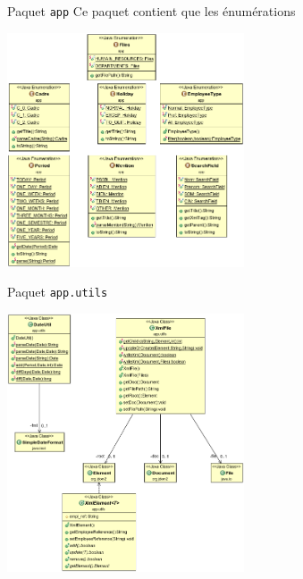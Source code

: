 \documentclass[captions=tableheading]{beamer}
\begin{document}
\begin{frame}[fragile,label={sec:orgc6680c5}]{Paquet \texttt{app}}
 Ce paquet contient que les énumérations \pause
\begin{center}
\includegraphics[width=7cm]{./diags/OverviewOnApp.png}
\end{center}
\end{frame}
\begin{frame}[fragile,label={sec:org65665a4}]{Paquet \texttt{app.utils}}
 \begin{center}
\includegraphics[width=7cm]{./diags/OverviewAppUtils1.png}
\end{center}
\end{frame}
\end{document}
